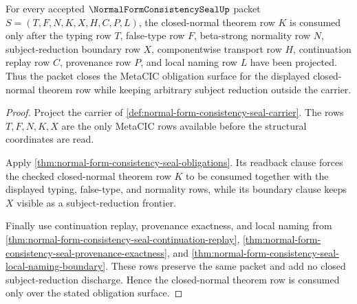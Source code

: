 \begin{theorem}
\label{thm:normal-form-consistency-seal-obligation-closure}
For every accepted $\NormalFormConsistencySealUp$ packet
$S=(T,F,N,K,X,H,C,P,L)$, the closed-normal theorem row $K$ is consumed only
after the typing row $T$, false-type row $F$, beta-strong normality row $N$,
subject-reduction boundary row $X$, componentwise transport row $H$,
continuation replay row $C$, provenance row $P$, and local naming row $L$ have
been projected. Thus the packet closes the MetaCIC obligation surface for the
displayed closed-normal theorem row while keeping arbitrary subject reduction
outside the carrier.
\end{theorem}
\begin{proof}
Project the carrier of
\autoref{def:normal-form-consistency-seal-carrier}. The rows $T,F,N,K,X$ are
the only MetaCIC rows available before the structural coordinates are read.

Apply \autoref{thm:normal-form-consistency-seal-obligations}. Its readback
clause forces the checked closed-normal theorem row $K$ to be consumed
together with the displayed typing, false-type, and normality rows, while its
boundary clause keeps $X$ visible as a subject-reduction frontier.

Finally use continuation replay, provenance exactness, and local naming from
\autoref{thm:normal-form-consistency-seal-continuation-replay},
\autoref{thm:normal-form-consistency-seal-provenance-exactness}, and
\autoref{thm:normal-form-consistency-seal-local-naming-boundary}. These rows
preserve the same packet and add no closed subject-reduction discharge. Hence
the closed-normal theorem row is consumed only over the stated obligation
surface.
\end{proof}


